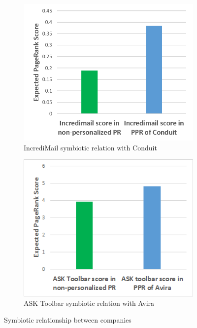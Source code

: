 \documentclass[ijoc,nonblindrev]{informs3} %
\numberwithin{equation}{subsection}
\begin{document}
\begin{figure}[!htbp]
\centering
\begin{subfigure}[b]{0.4\textwidth}
	\centering
\includegraphics[width=\textwidth]{figures/incredi_sym_conduit.png}
\caption{IncrediMail symbiotic relation with Conduit}
\label{fig:incredi_sym_conduit}
\end{subfigure}
\begin{subfigure}[b]{0.4\textwidth}
	\centering
\includegraphics[width=\textwidth]{figures/ask_sym_avira.png}
\caption{ASK Toolbar symbiotic relation with Avira}
\label{fig:ask_sym_avira}
\end{subfigure}
\caption{Symbiotic relationship between companies}
	\label{fig:symbiotic_pagerank}
\end{figure}
\end{document}
